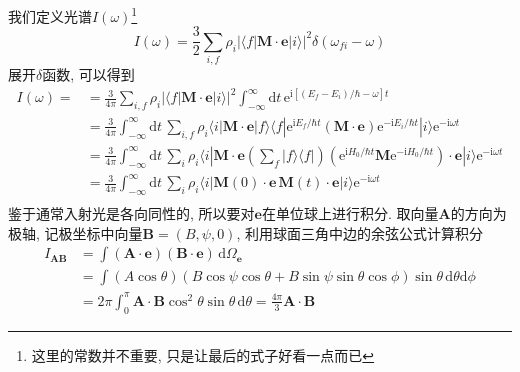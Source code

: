     我们定义光谱$I(\omega)$\footnote{这里的常数并不重要, 只是让最后的式子好看一点而已}
    \begin{equation}\label{eq:5-1}
        I(\omega) = \frac{3}{2} \sum_{i,f} \rho_i \left| \langle f|\bm{M} \cdot \bm{e}|i \rangle \right|^2 \delta(\omega_{fi} - \omega)
    \end{equation}
    展开$\delta$函数, 可以得到
    \begin{equation}\begin{aligned}
        I(\omega) = 
        &= \frac{3}{4\pi} \sum_{i,f} \rho_i \left| \langle f|\bm{M} \cdot \bm{e}|i \rangle \right|^2 \int_{-\infty}^{\infty} \mathrm{d}t\, \mathrm{e}^{\mathrm{i}\left[(E_f - E_i)/\hbar - \omega\right]t} \\
        &= \frac{3}{4\pi} \int_{-\infty}^{\infty} \mathrm{d}t\, \sum_{i,f} \rho_i \langle i|\bm{M} \cdot \bm{e}|f \rangle \langle f| \mathrm{e}^{\mathrm{i}E_f/\hbar t} \left(\bm{M} \cdot \bm{e}\right) \mathrm{e}^{-\mathrm{i}E_i/\hbar t} |i \rangle \mathrm{e}^{-\mathrm{i} \omega t} \\
        &= \frac{3}{4\pi} \int_{-\infty}^{\infty} \mathrm{d}t\, \sum_{i} \rho_i \langle i|\bm{M} \cdot \bm{e} \left(\sum_{f} |f \rangle \langle f| \right) \left( \mathrm{e}^{\mathrm{i}H_0/\hbar t} \bm{M} \mathrm{e}^{-\mathrm{i}H_0/\hbar t} \right) \cdot \bm{e}  |i \rangle \mathrm{e}^{-\mathrm{i} \omega t} \\
        &= \frac{3}{4\pi} \int_{-\infty}^{\infty} \mathrm{d}t\, \sum_{i} \rho_i \langle i|\bm{M}(0) \cdot \bm{e} \, \bm{M}(t) \cdot \bm{e} |i \rangle \mathrm{e}^{-\mathrm{i} \omega t} \\
    \end{aligned}\end{equation}
    鉴于通常入射光是各向同性的, 所以要对$\bm{e}$在单位球上进行积分. 取向量$\bm{A}$的方向为极轴, 记极坐标中向量$\bm{B} = (B, \psi, 0)$, 利用球面三角中边的余弦公式计算积分
    \begin{equation}\begin{aligned}
        I_{\bm{AB}} 
        &= \int (\bm{A} \cdot \bm{e})(\bm{B} \cdot \bm{e}) \,\mathrm{d} \Omega_{\bm e}\\
        &= \int (A\cos\theta)(B\cos\psi\cos\theta + B\sin\psi\sin\theta\cos\phi ) \sin\theta \,\mathrm{d}\theta \mathrm{d}\phi\\
        &= 2\pi \int_0^{\pi}\bm{A}\cdot\bm{B}\cos^2\theta\sin\theta\,\mathrm{d}\theta
         = \frac{4\pi}{3}\bm{A}\cdot\bm{B}
    \end{aligned}\end{equation}
